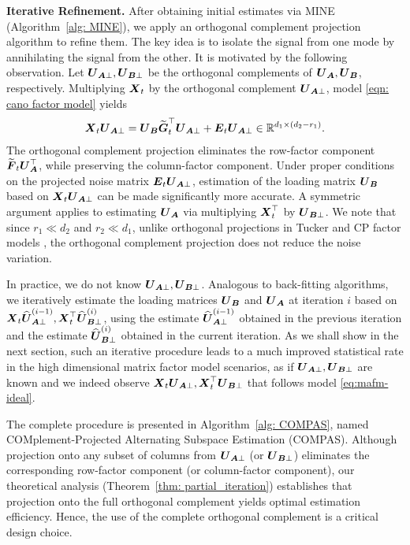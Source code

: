 \documentclass[11pt,letterpaper]{article}
\theoremstyle{definition}
\begin{document}
\noindent\textbf{Iterative Refinement.} After obtaining initial estimates via MINE (Algorithm~\ref{alg: MINE}), we apply an orthogonal complement projection algorithm to refine them. The key idea is to isolate the signal from one mode by annihilating the signal from the other.
It is motivated by the following observation. 
Let $\boldsymbol{U}_{\boldsymbol{A}\perp},\boldsymbol{U}_{\boldsymbol{B}\perp}$ be the orthogonal complements of $\boldsymbol{U}_{\boldsymbol{A}},\boldsymbol{U}_{\boldsymbol{B}}$, respectively.
Multiplying $\boldsymbol{X}_t$ by the orthogonal complement $\boldsymbol{U}_{\boldsymbol{A}\perp}$, model \eqref{eqn: cano factor model} yields
\begin{align}\label{eq:mafm-ideal}
\boldsymbol{X}_t \boldsymbol{U}_{\boldsymbol{A}\perp} =  \boldsymbol{U}_{\boldsymbol{B}} \widetilde{\boldsymbol{G}}_t^\top \boldsymbol{U}_{\boldsymbol{A}\perp} + \boldsymbol{E}_t \boldsymbol{U}_{\boldsymbol{A}\perp} \in \mathbb{R}^{d_1\times(d_2-r_1)}.    
\end{align}
The orthogonal complement projection eliminates the row-factor component $\widetilde{\boldsymbol{F}}_t \boldsymbol{U}_{\boldsymbol{A}}^\top$, while preserving the column-factor component. Under proper conditions on the projected noise matrix $\boldsymbol{E}_t \boldsymbol{U}_{\boldsymbol{A}\perp}$, estimation of the loading matrix $\boldsymbol{U}_{\boldsymbol{B}}$ based on $\boldsymbol{X}_t \boldsymbol{U}_{\boldsymbol{A}\perp}$ can be made significantly more accurate. A symmetric argument applies to estimating $\boldsymbol{U}_{\boldsymbol{A}}$ via multiplying $\boldsymbol{X}_t^\top$ by $\boldsymbol{U}_{\boldsymbol{B}\perp}$. We note that since $r_1\ll d_2 $ and $ r_2\ll d_1$, unlike orthogonal projections in Tucker and CP factor models \citep{han2024tensor,han2024cp}, the orthogonal complement projection does not reduce the noise variation. 

In practice, we do not know $\boldsymbol{U}_{\boldsymbol{A}\perp},\boldsymbol{U}_{\boldsymbol{B}\perp}$. Analogous to back-fitting algorithms, we iteratively estimate the loading matrices $\boldsymbol{U}_{\boldsymbol{B}}$ and $\boldsymbol{U}_{\boldsymbol{A}}$ at iteration $i$ based on $\boldsymbol{X}_t \widehat{\boldsymbol{U}}_{\boldsymbol{A}\perp}^{(i-1)} ,\boldsymbol{X}_t^\top \widehat{\boldsymbol{U}}_{\boldsymbol{B}\perp}^{(i)}$,
using the estimate $\widehat{\boldsymbol{U}}_{\boldsymbol{A}\perp}^{(i-1)}$ obtained in the previous iteration and the estimate $\widehat{\boldsymbol{U}}_{\boldsymbol{B}\perp}^{(i)}$ obtained in the current iteration. As we shall show in the next section, such an iterative procedure leads to a much improved statistical rate in the high dimensional matrix factor model scenarios, as if $\boldsymbol{U}_{\boldsymbol{A}\perp},\boldsymbol{U}_{\boldsymbol{B}\perp}$ are known and we indeed observe $\boldsymbol{X}_t \boldsymbol{U}_{\boldsymbol{A}\perp},\boldsymbol{X}_t^\top \boldsymbol{U}_{\boldsymbol{B}\perp}$ that follows model \eqref{eq:mafm-ideal}. 




The complete procedure is presented in Algorithm~\ref{alg: COMPAS}, named COMplement-Projected Alternating Subspace Estimation (COMPAS). Although projection onto any subset of columns from $\boldsymbol{U}_{\boldsymbol{A}\perp}$ (or $\boldsymbol{U}_{\boldsymbol{B}\perp}$) eliminates the corresponding row-factor component (or column-factor component), our theoretical analysis (Theorem~\ref{thm: partial_iteration}) establishes that projection onto the full orthogonal complement yields optimal estimation efficiency. Hence, the use of the complete orthogonal complement is a critical design choice.
\end{document}
